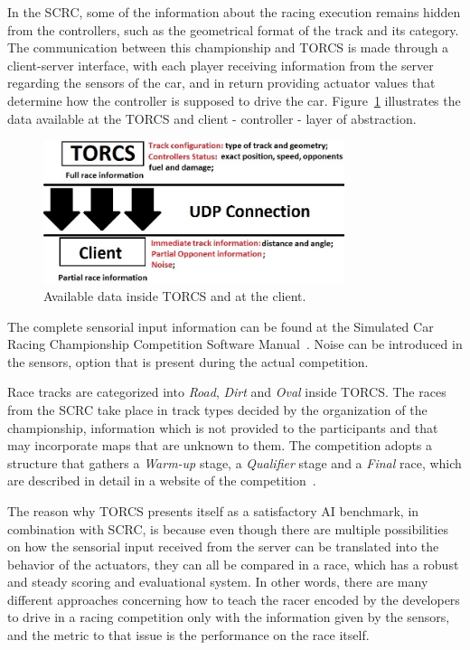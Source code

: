 	In the SCRC, some of the information about the racing execution remains hidden from the controllers, such as the geometrical format of the track and its category. The communication between this championship and TORCS is made through a client-server interface, with each player receiving information from the server regarding the sensors of the car, and in return providing actuator values that determine how the controller is supposed to drive the car. Figure~\ref{Fig:1} illustrates the data available at the TORCS and client - controller - layer of abstraction.

   	\begin{figure}[h]
		\centering
		\includegraphics[width=250pt]{Figure1}
		\caption{\label{Fig:1}Available data inside TORCS and at the client.}
	\end{figure}
	
	The complete sensorial input information can be found at the Simulated Car Racing Championship Competition Software Manual~\cite{SCRC}. Noise can be introduced in the sensors, option that is present during the actual competition.

	Race tracks are categorized into \emph{Road}, \emph{Dirt} and \emph{Oval} inside TORCS. The races from the SCRC take place in track types decided by the organization of the championship, information which is not provided to the participants and that may incorporate maps that are unknown to them. The competition adopts a structure that gathers a \textit{Warm-up} stage, a \textit{Qualifier} stage and a \textit{Final} race, which are described in detail in a website of the competition~\cite{SCRC}.
	
	The reason why TORCS presents itself as a satisfactory AI benchmark, in combination with SCRC, is because even	though there are multiple possibilities on how the sensorial input received from the server can be translated into the behavior of the actuators, they can all be compared in a race, which has a robust and steady scoring and evaluational system. In other words, there are many different approaches concerning how to teach the racer encoded by the developers to drive in a racing competition only with the information given by the sensors, and the metric to that issue is the performance on the race itself.

